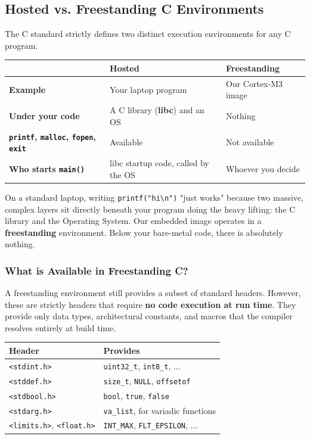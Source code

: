 \subsection{Hosted vs. Freestanding C Environments}
The C standard strictly defines two distinct execution environments for any C program.

\begin{table}[h!]
\centering
\begin{tabular}{|l|l|l|}
\hline
 & \textbf{Hosted} & \textbf{Freestanding} \\ \hline
\textbf{Example} & Your laptop program & Our Cortex-M3 image \\ \hline
\textbf{Under your code} & A C library (\textbf{libc}) and an OS & Nothing \\ \hline
\textbf{\texttt{printf}, \texttt{malloc}, \texttt{fopen}, \texttt{exit}} & Available & Not available \\ \hline
\textbf{Who starts \texttt{main()}} & libc startup code, called by the OS & Whoever you decide \\ \hline
\end{tabular}
\end{table}

On a standard laptop, writing \texttt{printf("hi\textbackslash{}n")} "just works" because two massive, complex layers sit directly beneath your program doing the heavy lifting: the C library and the Operating System. Our embedded image operates in a \textbf{freestanding} environment. Below your bare-metal code, there is absolutely nothing.

\subsubsection{What is Available in Freestanding C?}
A freestanding environment still provides a subset of standard headers. However, these are strictly headers that require \textbf{no code execution at run time}. They provide only data types, architectural constants, and macros that the compiler resolves entirely at build time.

\begin{table}[h!]
    \centering
    \begin{tabular}{|l|l|}
        \hline
        \textbf{Header} & \textbf{Provides} \\ \hline
        \texttt{<stdint.h>} & \texttt{uint32\_t}, \texttt{int8\_t}, ... \\ \hline
        \texttt{<stddef.h>} & \texttt{size\_t}, \texttt{NULL}, \texttt{offsetof} \\ \hline
        \texttt{<stdbool.h>} & \texttt{bool}, \texttt{true}, \texttt{false} \\ \hline
        \texttt{<stdarg.h>} & \texttt{va\_list}, for variadic functions \\ \hline
        \texttt{<limits.h>}, \texttt{<float.h>} & \texttt{INT\_MAX}, \texttt{FLT\_EPSILON}, ... \\ \hline
    \end{tabular}
\end{table}

